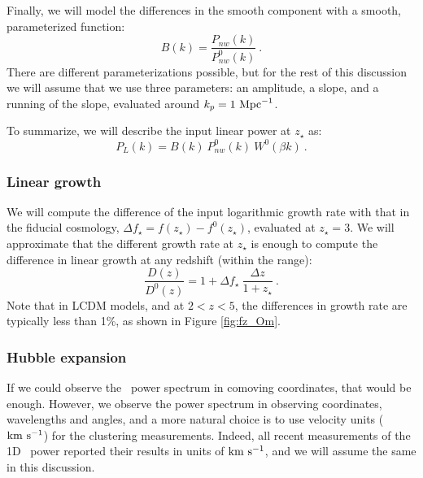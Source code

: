 Finally, we will model the differences in the smooth component with a smooth,
parameterized function:
\begin{equation}
 B(k) = \frac{P_{nw}(k)}{P_{nw}^0(k)} ~.
\end{equation}
There are different parameterizations possible, but for the rest of this 
discussion we will assume that we use three parameters: an amplitude, 
a slope, and a running of the slope, evaluated around $k_p = 1 \ \text{Mpc}^{-1}$. 

To summarize, we will describe the input linear power at $z_\star$ as:
\begin{equation} \label{eq:Pk_param}
 P_L(k) = B(k) ~ P_{nw}^0(k) ~ W^0(\beta k) ~.
\end{equation}

\subsubsection{Linear growth}

We will compute the difference of the input logarithmic growth rate with that 
in the fiducial cosmology, $\Delta f_\star = f(z_\star) - f^0(z_\star)$, 
evaluated at $z_\star=3$. 
We will approximate that the different growth rate at $z_\star$ is enough 
to compute the difference in linear growth at any redshift (within the range):
\begin{equation}\label{eq:growth}
 \frac{D(z)}{D^0(z)} = 1 + \Delta f_\star ~ \frac{\Delta z}{1 + z_\star} ~.
\end{equation} 
Note that in LCDM models, and at $2 < z < 5$, the differences in growth rate 
are typically less than 1\%, as shown in Figure \ref{fig:fz_Om}.

\subsubsection{Hubble expansion}

If we could observe the \lya\ power spectrum in comoving coordinates, that 
would be enough. 
However, we observe the power spectrum in observing coordinates, wavelengths
and angles, and a more natural choice is to use velocity units (${\rm km~s^{-1}}$) for 
the clustering measurements. 
Indeed, all recent measurements of the 1D \lya\ power reported their results
in units of ${\rm km~s^{-1}}$, and we will assume the same in this discussion.

